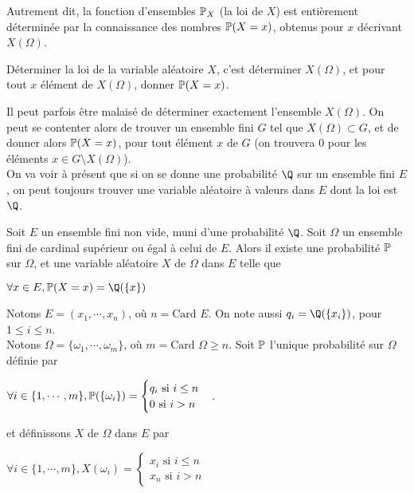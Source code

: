 \documentclass[12pt,a4paper]{report}
\begin{document}
\begin{remarque}{}
\begin{demo}{}
Autrement dit, la fonction d'ensembles $\mathbb{P}_X$ (la loi de $X$) est entièrement déterminée par la connaissance des nombres $\mathbb{P}(X=x)$, obtenus pour $x$ décrivant $X(\Omega)$.

\end{demo}

\begin{definition}{}{}
Déterminer la loi de la variable aléatoire $X$, c'est déterminer $X(\Omega)$, et pour tout $x$ élément de $X(\Omega)$, donner $\mathbb{P}(X=x)$.
\end{definition}

Il peut parfois être malaisé de déterminer exactement l'ensemble $X(\Omega)$. On peut se contenter alors de trouver un ensemble fini $G$ tel que $X(\Omega) \subset G$, et de donner alors $\mathbb{P}(X = x)$, pour tout élément $x$ de $G$ (on trouvera $0$ pour les éléments $x \in G \setminus X(\Omega)$). \\

On va voir à présent que si on se donne une probabilité $\Q$ sur un ensemble fini $E$, on peut toujours trouver une variable aléatoire à valeurs dans $E$ dont la loi est $\Q$.

\begin{theoreme}{}{}
Soit $E$ un ensemble fini non vide, muni d'une probabilité $\Q$. Soit $\Omega$ un ensemble fini de cardinal supérieur ou égal à celui de $E$. Alors il existe une probabilité $\mathbb{P}$ sur $\Omega$, et une variable aléatoire $X$ de $\Omega$ dans $E$ telle que 
\begin{center}
$\forall x \in E, \p(X=x) = \Q(\{x\})$
\end{center}
\end{theoreme}

\begin{demo}{}
Notons $E=(x_1,\cdots,x_n)$, où $n = \text{Card } E$. On note aussi $q_i = \Q(\{x_i\})$, pour $1 \le i \le n$. \\
Notons $\Omega = \{\omega_1,\cdots,\omega_m\}$, où $m = \text{Card }\Omega \ge n$. Soit $\mathbb{P}$ l'unique probabilité sur $\Omega$ définie par 
\begin{center}
$\forall i \in \{1,\cdots,m\}, \mathbb{P}(\{\omega_i\}) = \begin{cases} q_i \text{ si } i \le n \\ 0 \text{ si } i > n \end{cases}$.
\end{center}

et définissons $X$ de $\Omega$ dans $E$ par 
\begin{center}
$\forall i \in \{1,\cdots,m\}, X(\omega_i) = \begin{cases} x_i \text{ si } i \le n \\ x_n \text{ si } i > n \end{cases}$
\end{center}


\end{demo}
\end{remarque}
\end{document}
